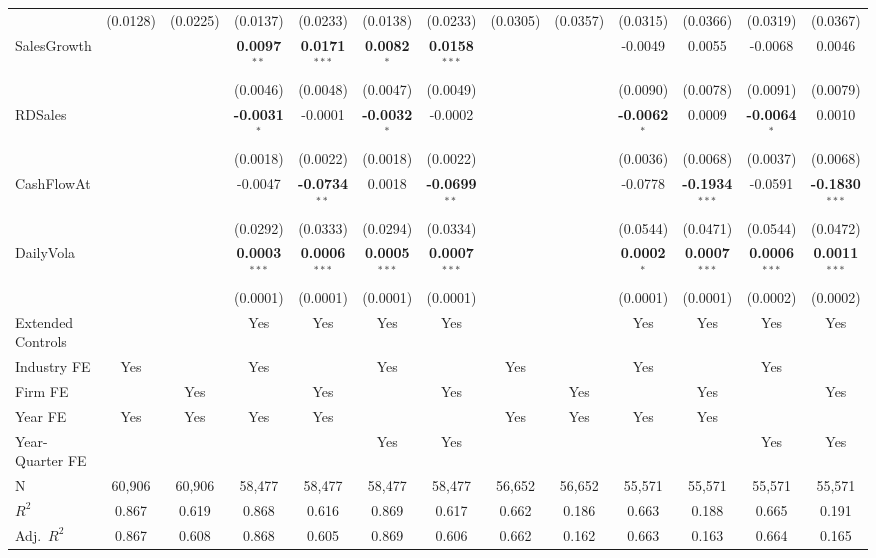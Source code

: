\begin{landscape}
\begin{table}[H]
\begin{tabular}{lcccccccccccc}
 & (0.0128) & (0.0225) & (0.0137) & (0.0233) & (0.0138) & (0.0233) & (0.0305) & (0.0357) & (0.0315) & (0.0366) & (0.0319) & (0.0367) \\
SalesGrowth &  &  & \textbf{0.0097}$^{**}$ & \textbf{0.0171}$^{***}$ & \textbf{0.0082}$^{*}$ & \textbf{0.0158}$^{***}$ &  &  & -0.0049 & 0.0055 & -0.0068 & 0.0046 \\
 &  &  & (0.0046) & (0.0048) & (0.0047) & (0.0049) &  &  & (0.0090) & (0.0078) & (0.0091) & (0.0079) \\
RDSales &  &  & \textbf{-0.0031}$^{*}$ & -0.0001 & \textbf{-0.0032}$^{*}$ & -0.0002 &  &  & \textbf{-0.0062}$^{*}$ & 0.0009 & \textbf{-0.0064}$^{*}$ & 0.0010 \\
 &  &  & (0.0018) & (0.0022) & (0.0018) & (0.0022) &  &  & (0.0036) & (0.0068) & (0.0037) & (0.0068) \\
CashFlowAt &  &  & -0.0047 & \textbf{-0.0734}$^{**}$ & 0.0018 & \textbf{-0.0699}$^{**}$ &  &  & -0.0778 & \textbf{-0.1934}$^{***}$ & -0.0591 & \textbf{-0.1830}$^{***}$ \\
 &  &  & (0.0292) & (0.0333) & (0.0294) & (0.0334) &  &  & (0.0544) & (0.0471) & (0.0544) & (0.0472) \\
DailyVola &  &  & \textbf{0.0003}$^{***}$ & \textbf{0.0006}$^{***}$ & \textbf{0.0005}$^{***}$ & \textbf{0.0007}$^{***}$ &  &  & \textbf{0.0002}$^{*}$ & \textbf{0.0007}$^{***}$ & \textbf{0.0006}$^{***}$ & \textbf{0.0011}$^{***}$ \\
 &  &  & (0.0001) & (0.0001) & (0.0001) & (0.0001) &  &  & (0.0001) & (0.0001) & (0.0002) & (0.0002) \\
\midrule
Extended Controls &  &  & Yes & Yes & Yes & Yes &  &  & Yes & Yes & Yes & Yes \\
Industry FE & Yes &  & Yes &  & Yes &  & Yes &  & Yes &  & Yes &  \\
Firm FE &  & Yes &  & Yes &  & Yes &  & Yes &  & Yes &  & Yes \\
Year FE & Yes & Yes & Yes & Yes &  &  & Yes & Yes & Yes & Yes &  &  \\
Year-Quarter FE &  &  &  &  & Yes & Yes &  &  &  &  & Yes & Yes \\
\midrule
N & 60,906 & 60,906 & 58,477 & 58,477 & 58,477 & 58,477 & 56,652 & 56,652 & 55,571 & 55,571 & 55,571 & 55,571 \\
$R^2$ & 0.867 & 0.619 & 0.868 & 0.616 & 0.869 & 0.617 & 0.662 & 0.186 & 0.663 & 0.188 & 0.665 & 0.191 \\
Adj.~$R^2$ & 0.867 & 0.608 & 0.868 & 0.605 & 0.869 & 0.606 & 0.662 & 0.162 & 0.663 & 0.163 & 0.664 & 0.165 \\

\end{tabular}
\end{table}
\end{landscape}
